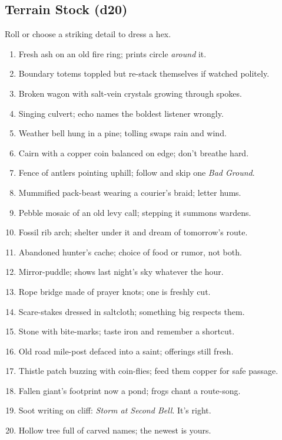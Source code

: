 \subsection*{Terrain Stock (d20)}
\label{sec:wilderness-terrain-stock}
Roll or choose a striking detail to dress a hex.
\begin{enumerate}
  \item Fresh ash on an old fire ring; prints circle \emph{around} it.
  \item Boundary totems toppled but re-stack themselves if watched politely.
  \item Broken wagon with salt-vein crystals growing through spokes.
  \item Singing culvert; echo names the boldest listener wrongly.
  \item Weather bell hung in a pine; tolling swaps rain and wind.
  \item Cairn with a copper coin balanced on edge; don't breathe hard.
  \item Fence of antlers pointing uphill; follow and skip one \emph{Bad Ground}.
  \item Mummified pack-beast wearing a courier's braid; letter hums.
  \item Pebble mosaic of an old levy call; stepping it summons wardens.
  \item Fossil rib arch; shelter under it and dream of tomorrow's route.
  \item Abandoned hunter's cache; choice of food or rumor, not both.
  \item Mirror-puddle; shows last night's sky whatever the hour.
  \item Rope bridge made of prayer knots; one is freshly cut.
  \item Scare-stakes dressed in saltcloth; something big respects them.
  \item Stone with bite-marks; taste iron and remember a shortcut.
  \item Old road mile-post defaced into a saint; offerings still fresh.
  \item Thistle patch buzzing with coin-flies; feed them copper for safe passage.
  \item Fallen giant's footprint now a pond; frogs chant a route-song.
  \item Soot writing on cliff: \emph{Storm at Second Bell}. It's right.
  \item Hollow tree full of carved names; the newest is yours.
\end{enumerate}

